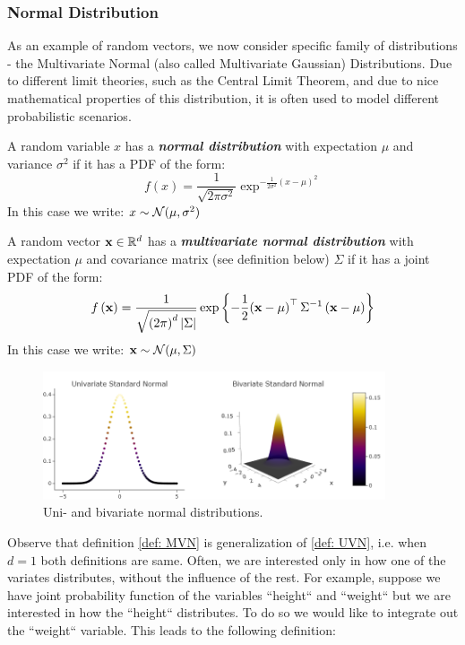 	
\subsubsection{Normal Distribution}
As an example of random vectors, we now consider specific family of distributions - the Multivariate Normal (also called Multivariate Gaussian) Distributions. Due to different limit theories, such as the Central Limit Theorem, and due to nice mathematical properties of this distribution, it is often used to model different probabilistic scenarios.

\begin{definition} \label{def: UVN}
A random variable $x$ has a \textbf{\textit{normal distribution}} with expectation $\mu$ and variance $\sigma^2$ if it has a PDF of the form:
	$$f\left(x\right) = \frac{1}{\sqrt{2\pi\sigma^2} } \exp^{ -\frac{1}{2\sigma^2} \left(x-\mu\right)^2 } $$
In this case we write: $x\sim\mathcal{N}(\mu,\sigma^2)$
	
\end{definition}
\begin{definition} \label{def: MVN}
A random vector $\mathbf{x}\in\mathbb{R}^d$ has a \textbf{\textit{multivariate normal distribution}} with expectation $\mu$ and covariance matrix (see definition below) $\Sigma$ if it has a joint PDF of the form: $$f\left(\mathbf{x}\right)=\frac{1}{\sqrt{\left(2\pi\right)^{d}\left|\Sigma\right|}}\exp\left\{ -\frac{1}{2}{\left(\mathbf{x}-\mu\right)^{\top}\Sigma^{-1}\left(\mathbf{x}-\mu\right)}\right\} $$
In this case we write: $\mathbf{x}\sim\mathcal{N}(\mu,\Sigma)$
\end{definition}

\begin{figure}[h!]
	\centering
	\includegraphics[width=0.9\textwidth]{chapters/mathematical.basis/figures/normal_distributions.png}
	\caption{Uni- and bivariate normal distributions. \GitChapterOneExamples}
\end{figure}

Observe that definition \ref{def: MVN} is generalization of \ref{def: UVN}, i.e. when $d = 1$ both definitions are same. Often, we are interested only in how one of the variates distributes, without the influence of the rest. For example, suppose we have joint probability function of the variables ``height`` and ``weight`` but we are interested in how the ``height`` distributes. To do so we would like to integrate out the ``weight`` variable. This leads to the following definition:

